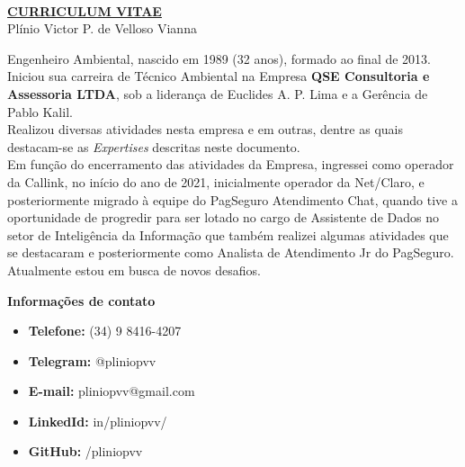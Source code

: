 \documentclass[12pt,a4paper,oneside,sumario=tradicional,brazil]{abntex2}
\begin{document}

\

\vspace{5cm}
\begin{center}
	\textbf{\underline{{\HUGE CURRICULUM VITAE}}} \\
	\vspace{1cm}
	{\large Plínio Victor P. de Velloso Vianna}	
\end{center}

\newpage
\textual

Engenheiro Ambiental, nascido em 1989 (32 anos), formado ao final de 2013. Iniciou sua carreira de Técnico Ambiental na Empresa \textbf{QSE Consultoria e Assessoria LTDA}, sob a liderança de Euclides A. P. Lima e a Gerência de Pablo Kalil. \\
\indent
Realizou diversas atividades nesta empresa e em outras, dentre as quais destacam-se as \textit{Expertises} descritas neste documento. \\
\indent
Em função do encerramento das atividades da Empresa, ingressei como operador da Callink, no início do ano de 2021, inicialmente operador da Net/Claro, e posteriormente migrado à equipe do PagSeguro Atendimento Chat, quando tive a oportunidade de progredir para ser lotado no cargo de Assistente de Dados no setor de Inteligência da Informação que também realizei algumas atividades que se destacaram e posteriormente como Analista de Atendimento Jr do PagSeguro. \\
Atualmente estou em busca de novos desafios.

\begin{center}
	\textbf{{\Large Informações de contato}} \\
\end{center}
\begin{itemize}
	\item \textbf{Telefone:} (34) 9 8416-4207 \\
	\vspace{-1cm}
	\item \textbf{Telegram:} @pliniopvv \\
	\vspace{-1cm}
	\item \textbf{E-mail:} pliniopvv@gmail.com \\
	\vspace{-1cm}
	\item \textbf{LinkedId:} in/pliniopvv/ \\
	\vspace{-1cm}
	\item \textbf{GitHub:} /pliniopvv \\
\end{itemize}
\end{document}
